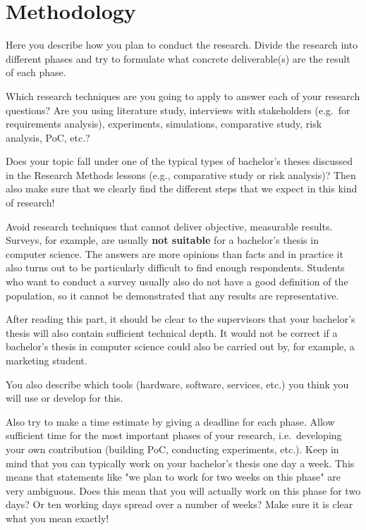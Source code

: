 \documentclass[english]{hogent-article}
\begin{document}
\section{Methodology}%
\label{sec:methodology}


Here you describe how you plan to conduct the research. Divide the research into different phases and try to formulate what concrete deliverable(s) are the result of each phase.

Which research techniques are you going to apply to answer each of your research questions? Are you using literature study, interviews with stakeholders (e.g.\ for requirements analysis), experiments, simulations, comparative study, risk analysis, PoC, etc.?

Does your topic fall under one of the typical types of bachelor's theses discussed in the Research Methods lessons (e.g., comparative study or risk analysis)? Then also make sure that we clearly find the different steps that we expect in this kind of research!

Avoid research techniques that cannot deliver objective, measurable results. Surveys, for example, are usually \textbf{not suitable} for a bachelor's thesis in computer science. The answers are more opinions than facts and in practice it also turns out to be particularly difficult to find enough respondents. Students who want to conduct a survey usually also do not have a good definition of the population, so it cannot be demonstrated that any results are representative.

After reading this part, it should be clear to the supervisors that your bachelor's thesis will also contain sufficient technical depth. It would not be correct if a bachelor's thesis in computer science could also be carried out by, for example, a marketing student.

You also describe which tools (hardware, software, services, etc.) you think you will use or develop for this.

Also try to make a time estimate by giving a deadline for each phase. Allow sufficient time for the most important phases of your research, i.e.\ developing your own contribution (building PoC, conducting experiments, etc.). Keep in mind that you can typically work on your bachelor's thesis one day a week. This means that statements like "we plan to work for two weeks on this phase" are very ambiguous. Does this mean that you will actually work on this phase for two days? Or ten working days spread over a number of weeks? Make sure it is clear what you mean exactly!
\end{document}
